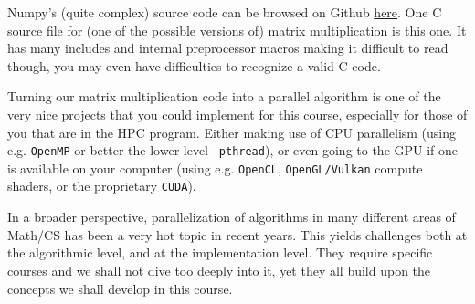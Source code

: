 \documentclass[12pt]{article}
\theoremstyle{plain}
\theoremstyle{remark}
\begin{document}
Numpy's (quite complex) source code can be browsed on Github 
\href{https://github.com/numpy/numpy/tree/main}{here}. One C source
file for (one of the possible versions of) matrix multiplication is
\href{https://github.com/numpy/numpy/blob/main/numpy/_core/src/umath/matmul.c.src}{this
one}. It has many includes and internal preprocessor macros making it difficult 
to read though, you may even have difficulties to recognize a valid C code.   

\medskip

Turning our matrix multiplication code into a parallel algorithm is one of the
very nice projects that you could implement for this course, especially for
those of you that are in the HPC program. Either making use of
CPU parallelism (using e.g. {\tt OpenMP} or better the lower level {\tt
pthread}), or even going to the GPU if one is 
available on your computer (using e.g. {\tt OpenCL}, {\tt OpenGL/Vulkan} 
compute shaders, or the proprietary {\tt CUDA}).

\medskip

In a broader perspective, parallelization of algorithms in many different areas
of Math/CS has been a very hot topic in recent years. This yields challenges both at the
algorithmic level, and at the implementation level. They require specific courses 
and we shall not dive too deeply into it, yet they all build upon the concepts
we shall develop in this course.
\end{document}
